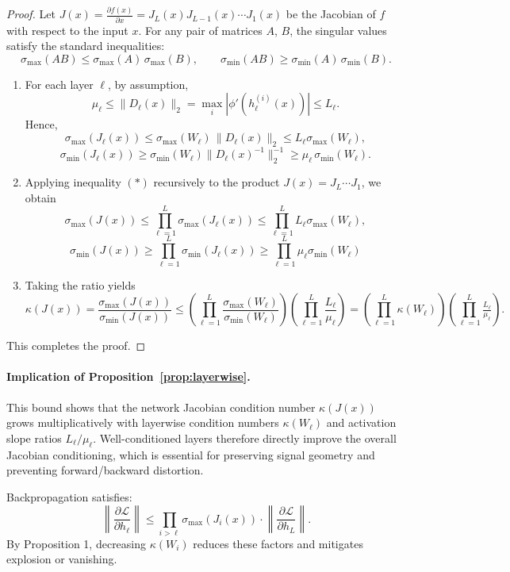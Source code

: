 \documentclass{opt2025}
\begin{document}
\begin{proof}
Let $J(x) = \frac{\partial f(x)}{\partial x} = J_L(x)J_{L-1}(x)\cdots J_1(x)$ be the Jacobian of $f$ with respect to the input $x$. For any pair of matrices $A$, $B$, the singular values satisfy the standard inequalities:
\[
\sigma_{\max}(AB)\le\sigma_{\max}(A)\,\sigma_{\max}(B),
\qquad
\sigma_{\min}(AB)\ge\sigma_{\min}(A)\,\sigma_{\min}(B).
\tag{$*$}
\]
\begin{enumerate}
\item For each layer $\ell$, by assumption,
\[
\mu_\ell \le \|D_\ell(x)\|_2 = \max_i|\phi'(h_\ell^{(i)}(x))| \le L_\ell.
\]
Hence, 
\[
\sigma_{\max}(J_\ell(x))
\le \sigma_{\max}(W_\ell)\,\|D_\ell(x)\|_2
\le L_\ell\sigma_{\max}(W_\ell),
\]
\[
\sigma_{\min}(J_\ell(x))
\ge \sigma_{\min}(W_\ell)\|D_\ell(x)^{-1}\|_2^{-1}
\ge \mu_\ell\,\sigma_{\min}(W_\ell).
\]
\item Applying inequality $(*)$ recursively to the product $J(x) = J_L \cdots J_1$, we obtain
\[
\sigma_{\max}(J(x)) \le \prod_{\ell=1}^L \sigma_{\max}(J_\ell(x)) \le \prod_{\ell=1}^L L_\ell\sigma_{\max}(W_\ell),
\]
\[
\sigma_{\min}(J(x)) \ge \prod_{\ell=1}^L \sigma_{\min}(J_\ell(x)) \ge \prod_{\ell=1}^L\mu_{\ell}\sigma_{\min}(W_\ell)
\]
\item Taking the ratio yields
\[
\kappa(J(x))
=\frac{\sigma_{\max}(J(x))}{\sigma_{\min}(J(x))}
\le
\left(\prod_{\ell=1}^{L}\frac{\sigma_{\max}(W_\ell)}{\sigma_{\min}(W_\ell)}\right)
\left(\prod_{\ell=1}^{L}\frac{L_\ell}{\mu_\ell}\right)
=
\left(\prod_{\ell=1}^{L}\kappa(W_\ell)\right)
\left(\prod_{\ell=1}^{L}\tfrac{L_\ell}{\mu_\ell}\right).
\]
\end{enumerate}
This completes the proof.
\end{proof}

\paragraph{Implication of Proposition~\ref{prop:layerwise}.}
This bound shows that the network Jacobian condition number $\kappa(J(x))$
grows multiplicatively with layerwise condition numbers $\kappa(W_\ell)$
and activation slope ratios $L_\ell / \mu_\ell$.
Well-conditioned layers therefore directly improve the overall Jacobian conditioning,
which is essential for preserving signal geometry and preventing forward/backward distortion.

\begin{corollary}
\label{cor:grad}
Backpropagation satisfies:
\[
\left\| \frac{\partial \mathcal{L}}{\partial h_\ell} \right\|
\le \prod_{i > \ell} \sigma_{\max}(J_i(x)) \cdot
\left\| \frac{\partial \mathcal{L}}{\partial h_L} \right\|.
\]
By Proposition 1, decreasing $\kappa(W_i)$ reduces these factors and mitigates explosion or vanishing.

\end{corollary}
\end{document}
